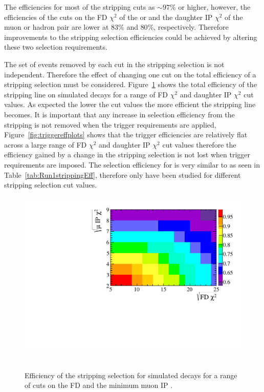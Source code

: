 The efficiencies for most of the stripping cuts as $\sim 97 \%$ or higher, however, the efficiencies of the cuts on the FD $\chi^{2}$ of the \bsd or \jpsi and the daughter IP $\chi^{2}$ of the muon or hadron pair are lower at $83 \%$ and $80 \%$, respectively. Therefore improvements to the stripping selection efficiencies could be achieved by altering these two selection requirements. 



The set of events removed by each cut in the stripping selection is not independent. Therefore the effect of changing one cut on the total efficiency of a stripping selection must be considered. Figure~\ref{fig:efficiencyplots} shows the total efficiency of the \bsmumu stripping line on simulated \bsmumu decays for a range of FD $\chi^{2}$ and daughter IP $\chi^{2}$ cut values. As expected the lower the cut values the more efficient the stripping line becomes. It is important that any increase in \bsmumu selection efficiency from the stripping is not removed when the trigger requirements are applied, Figure~\ref{fig:triggereffplots} shows that the trigger efficiencies are relatively flat across a large range of FD $\chi^{2}$ and daughter IP $\chi^{2}$ cut values therefore the efficiency gained by a change in the stripping selection is not lost when trigger requirements are imposed. The selection efficiency for \bdmumu is very similar to \bsmumu as seen in Table~\ref{tab:Run1strippingEff}, therefore only \bsmumu have been studied for different stripping selection cut values. 


\begin{figure}[htbp]
    \centering
        \includegraphics[width= 0.8 \textwidth]{./Figs/Selection/Bs2MuMu_efficiency_chart_Feb3.pdf}
    ~ %
    \caption{Efficiency of the \bmumu stripping selection for \bsmumu simulated decays for a range of cuts on the \bs FD \chisqd and the minimum muon IP \chisqd.}
    \label{fig:efficiencyplots}
\end{figure}

